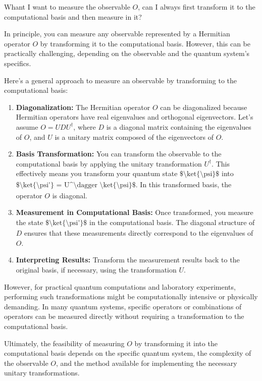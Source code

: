 \begin{ai}
Whant I want to measure the observable $O$, can I always first transform it to the computational
basis and then measure in it?
\end{ai}

\begin{airesult}
In principle, you can measure any observable represented by a Hermitian operator \( O \) by
transforming it to the computational basis. However, this can be practically challenging, depending
on the observable and the quantum system's specifics.

\vsp

Here's a general approach to measure an observable by transforming to the computational basis:

\vsp

\begin{enumerate}
  \item \textbf{Diagonalization:} The Hermitian operator \( O \) can be diagonalized because
Hermitian operators have real eigenvalues and orthogonal eigenvectors. Let's assume \( O =
UDU^\dagger \), where \( D \) is a diagonal matrix containing the eigenvalues of \( O \), and \( U
\) is a unitary matrix composed of the eigenvectors of \( O \).

  \item \textbf{Basis Transformation:} You can transform the observable to the computational basis
by applying the unitary transformation \( U^\dagger \). This effectively means you transform your
quantum state \( \ket{\psi} \) into \( \ket{\psi'} = U^\dagger \ket{\psi} \). In this transformed
basis, the operator \( O \) is diagonal.

  \item \textbf{Measurement in Computational Basis:} Once transformed, you measure the state \(
\ket{\psi'} \) in the computational basis. The diagonal structure of \( D \) ensures that these
measurements directly correspond to the eigenvalues of \( O \).

  \item \textbf{Interpreting Results:} Transform the measurement results back to the original basis,
if necessary, using the transformation \( U \).
\end{enumerate}

\vsp

However, for practical quantum computations and laboratory experiments, performing such
transformations might be computationally intensive or physically demanding. In many quantum systems,
specific operators or combinations of operators can be measured directly without requiring a
transformation to the computational basis.

\vsp

Ultimately, the feasibility of measuring \( O \) by transforming it into the computational basis
depends on the specific quantum system, the complexity of the observable \( O \), and the method
available for implementing the necessary unitary transformations.
\end{airesult}



